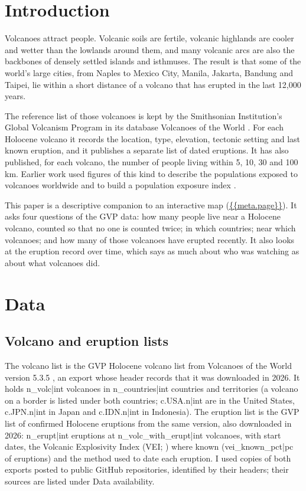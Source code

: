 \documentclass[11pt,a4paper]{article}
\begin{document}
\section{Introduction}
Volcanoes attract people. Volcanic soils are fertile, volcanic highlands are cooler and wetter than the lowlands around them, and many volcanic arcs are also the backbones of densely settled islands and isthmuses. The result is that some of the world's large cities, from Naples to Mexico City, Manila, Jakarta, Bandung and Taipei, lie within a short distance of a volcano that has erupted in the last 12,000 years.

The reference list of those volcanoes is kept by the Smithsonian Institution's Global Volcanism Program in its database Volcanoes of the World \citep{gvp535}. For each Holocene volcano it records the location, type, elevation, tectonic setting and last known eruption, and it publishes a separate list of dated eruptions. It has also published, for each volcano, the number of people living within 5, 10, 30 and 100 km. Earlier work used figures of this kind to describe the populations exposed to volcanoes worldwide and to build a population exposure index \citep{brown2015}.

This paper is a descriptive companion to an interactive map (\url{{{meta.page}}}). It asks four questions of the GVP data: how many people live near a Holocene volcano, counted so that no one is counted twice; in which countries; near which volcanoes; and how many of those volcanoes have erupted recently. It also looks at the eruption record over time, which says as much about who was watching as about what volcanoes did.

\section{Data}
\subsection{Volcano and eruption lists}
The volcano list is the GVP Holocene volcano list from Volcanoes of the World version 5.3.5 \citep{gvp535}, an export whose header records that it was downloaded in 2026. It holds {{n_volc|int}} volcanoes in {{n_countries|int}} countries and territories (a volcano on a border is listed under both countries; {{c.USA.n|int}} are in the United States, {{c.JPN.n|int}} in Japan and {{c.IDN.n|int}} in Indonesia). The eruption list is the GVP list of confirmed Holocene eruptions from the same version, also downloaded in 2026: {{n_erupt|int}} eruptions at {{n_volc_with_erupt|int}} volcanoes, with start dates, the Volcanic Explosivity Index (VEI; \citealt{newhall1982}) where known ({{vei_known_pct|pc}} of eruptions) and the method used to date each eruption. I used copies of both exports posted to public GitHub repositories, identified by their headers; their sources are listed under Data availability.
\end{document}
